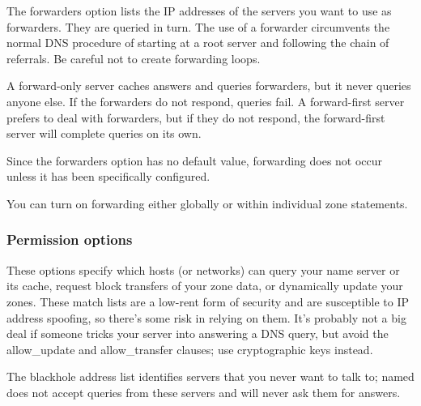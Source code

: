 The {forwarders} option lists the IP addresses of the servers you want
to use as forwarders. They are queried in turn. The use of a forwarder
circumvents the normal DNS procedure of starting at a root server and
following the chain of referrals. Be careful not to create forwarding
loops.

A
\protect\hypertarget{part0024_split_037.htmlux5cux23_idIndexMarker2147}{}{}forward-only
server caches answers and queries forwarders, but it never queries
anyone else. If the forwarders do not respond, queries fail. A
forward-first server prefers to deal with forwarders, but if they do not
respond, the forward-first server will complete queries on its own.

Since the {forwarders} option has no default value, forwarding does not
occur unless it has been specifically configured.

You can turn on forwarding either globally or
\protect\hypertarget{part0024_split_037.htmlux5cux23_idIndexMarker2148}{}{}within
individual {zone} statements.

\subsubsection[Permission options]{\texorpdfstring{Permission
options\protect\hypertarget{part0024_split_037.htmlux5cux23_idIndexMarker2149}{}{}\protect\hypertarget{part0024_split_037.htmlux5cux23_idIndexMarker2150}{}{}\protect\hypertarget{part0024_split_037.htmlux5cux23_idTextAnchor901}{}{}\protect\hypertarget{part0024_split_037.htmlux5cux23_idIndexMarker2151}{}{}\protect\hypertarget{part0024_split_037.htmlux5cux23_idTextAnchor902}{}{}\protect\hypertarget{part0024_split_037.htmlux5cux23_idIndexMarker2152}{}{}\protect\hypertarget{part0024_split_037.htmlux5cux23_idTextAnchor903}{}{}\protect\hypertarget{part0024_split_037.htmlux5cux23_idIndexMarker2153}{}{}}{Permission options}}


These options specify which hosts (or networks) can query your name
server or its cache, request block transfers of your zone data, or
dynamically update your zones. These match lists are a low-rent form of
security and are susceptible to IP address spoofing, so there's some
risk in relying on them. It's probably not a big deal if someone tricks
your server into answering a DNS query, but avoid the {allow\_update}
and {allow\_transfer} clauses; use cryptographic keys instead.

The {blackhole} address list identifies servers that you never want to
talk to; {named} does not accept queries from these servers and will
never ask them for answers.

